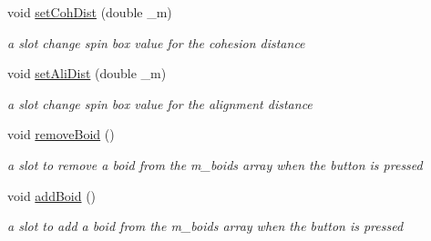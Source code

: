 \begin{DoxyCompactItemize}
void \hyperlink{classGLWindow_ab8e382574f3cb42848feb8243ea43046}{setCohDist} (double \_\-m)
\begin{DoxyCompactList}\small\item\em a slot change spin box value for the cohesion distance \end{DoxyCompactList}\item 
void \hyperlink{classGLWindow_a822698ed274357b125b86b96437bb261}{setAliDist} (double \_\-m)
\begin{DoxyCompactList}\small\item\em a slot change spin box value for the alignment distance \end{DoxyCompactList}\item 
\hypertarget{classGLWindow_a092b2f8ed729523621fa725c77ce7ac7}{
void \hyperlink{classGLWindow_a092b2f8ed729523621fa725c77ce7ac7}{removeBoid} ()}
\label{classGLWindow_a092b2f8ed729523621fa725c77ce7ac7}

\begin{DoxyCompactList}\small\item\em a slot to remove a boid from the m\_\-boids array when the button is pressed \end{DoxyCompactList}\item 
\hypertarget{classGLWindow_ae09ab83e83150de75ffb14b8344a4de1}{
void \hyperlink{classGLWindow_ae09ab83e83150de75ffb14b8344a4de1}{addBoid} ()}
\label{classGLWindow_ae09ab83e83150de75ffb14b8344a4de1}

\begin{DoxyCompactList}\small\item\em a slot to add a boid from the m\_\-boids array when the button is pressed \end{DoxyCompactList}\end{DoxyCompactItemize}
